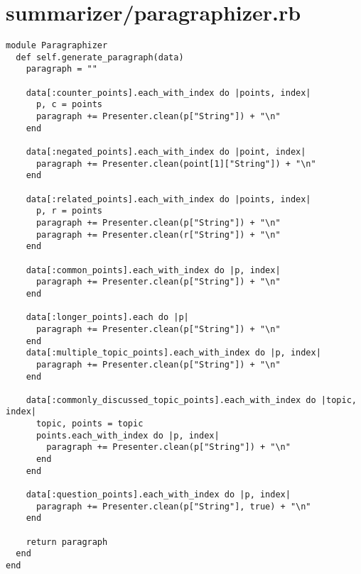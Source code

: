 \documentclass{article}
\begin{document}
\section*{summarizer/paragraphizer.rb}
\begin{verbatim}
module Paragraphizer
  def self.generate_paragraph(data)
    paragraph = ""

    data[:counter_points].each_with_index do |points, index|
      p, c = points
      paragraph += Presenter.clean(p["String"]) + "\n"
    end

    data[:negated_points].each_with_index do |point, index|
      paragraph += Presenter.clean(point[1]["String"]) + "\n"
    end

    data[:related_points].each_with_index do |points, index|
      p, r = points
      paragraph += Presenter.clean(p["String"]) + "\n"
      paragraph += Presenter.clean(r["String"]) + "\n"
    end

    data[:common_points].each_with_index do |p, index|
      paragraph += Presenter.clean(p["String"]) + "\n"
    end

    data[:longer_points].each do |p|
      paragraph += Presenter.clean(p["String"]) + "\n"
    end
    data[:multiple_topic_points].each_with_index do |p, index|
      paragraph += Presenter.clean(p["String"]) + "\n"
    end

    data[:commonly_discussed_topic_points].each_with_index do |topic, index|
      topic, points = topic
      points.each_with_index do |p, index|
        paragraph += Presenter.clean(p["String"]) + "\n"
      end
    end

    data[:question_points].each_with_index do |p, index|
      paragraph += Presenter.clean(p["String"], true) + "\n"
    end

    return paragraph
  end
end


\end{verbatim}
\pagebreak
\end{document}
